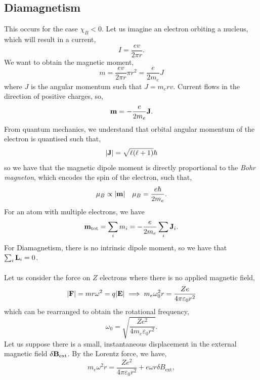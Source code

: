 \documentclass{book}
\begin{document}
\subsection{Diamagnetism}
This occurs for the case $\chi_B < 0$. Let us imagine an electron orbiting a nucleus, which will result in a current,
\begin{equation}
	I = \frac{ev}{2\pi r}.
\end{equation}
We want to obtain the magnetic moment,
\begin{equation}
	m = \frac{ev}{2\pi r}\pi r^2 = \frac{e}{2m_e}J
\end{equation}
where $J$ is the angular momentum such that $J = m_erv$. Current flows in the direction of positive charges, so,
\begin{equation}
	\vb{m} = - \frac{e}{2m_e}\vb{J}.
\end{equation}
From quantum mechanics, we understand that orbital angular momentum of the electron is quantised such that,
\begin{equation}
	\left|\vb{J}\right| = \sqrt{\ell(\ell + 1)}\hbar
\end{equation}
so we have that the magnetic dipole moment is directly proportional to the \textit{Bohr magneton}, which encodes the spin of the electron, such that,
\begin{align}
	\mu_B \propto |\vb{m}| && \mu_B = \frac{e\hbar}{2m_e}.
\end{align}
For an atom with multiple electrons, we have 
\begin{equation}
	\vb{m}_{\text{tot}} = \sum_i m_i = -\frac{e}{2m_e}\sum_i\vb{J}_i.
\end{equation}
For Diamagnetism, there is no intrinsic dipole moment, so we have that $\sum_i \vb{L}_i = 0$.
\\\\
Let us consider the force on $Z$ electrons where there is no applied magnetic field, 
\begin{equation}
	|\vb{F}| = mr\omega^2 = q|\vb{E}| \implies m_e \omega_0^2 r = \frac{Ze}{4\pi\varepsilon_0 r^2}
\end{equation} 
which can be rearranged to obtain the rotational frequency,
\begin{equation}
	\omega_0 = \sqrt{\frac{Ze^2}{4m_e\varepsilon_0 r^2}}.
\end{equation}
Let us suppose there is a small, instantaneous displacement in the external magnetic field $\delta \vb{B}_{\text{ext}}$. By the Lorentz force, we have,
\begin{equation}
	m_e \omega^2 r = \frac{Ze^2}{4\pi \varepsilon_0 r^2} + e\omega r \delta B_{\text{ext}},
\end{equation}
\end{document}
